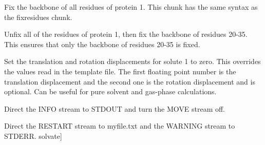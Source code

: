\documentclass[letterpaper,10pt,english]{sphinxmanual}
\begin{document}
Fix the backbone of all residues of protein 1. This chunk has the same syntax as the fixresidues chunk.

%
\begin{sphinxVerbatim}[commandchars=\\\{\}]
    
\end{sphinxVerbatim}

Unfix all of the residues of protein 1, then fix the backbone of residues 20-35. This ensures that only the backbone of residues 20-35 is fixed.

%
\begin{sphinxVerbatim}[commandchars=\\\{\}]
    
\end{sphinxVerbatim}

Set the translation and rotation displacements for solute 1 to zero. This overrides the values read in the template file. The first floating point number is the translation displacement and the second one is the rotation displacement and is optional. Can be useful for pure solvent and gas-phase calculations.

\ignorespaces 
\def\sphinxLiteralBlockLabel{\label{\detokenize{protoms:index-90}}}
%
\begin{sphinxVerbatim}[commandchars=\\\{\}]
  
\end{sphinxVerbatim}

Direct the INFO stream to STDOUT and turn the MOVE stream off.

%
\begin{sphinxVerbatim}[commandchars=\\\{\}]
  
\end{sphinxVerbatim}

Direct the RESTART stream to myfile.txt and the WARNING stream to STDERR. solvate{]}

\ignorespaces 
\def\sphinxLiteralBlockLabel{\label{\detokenize{protoms:index-91}}}
%
\begin{sphinxVerbatim}[commandchars=\\\{\}]
      \PYG{p}{[}     \PYG{p}{]}
\end{sphinxVerbatim}
\end{document}
